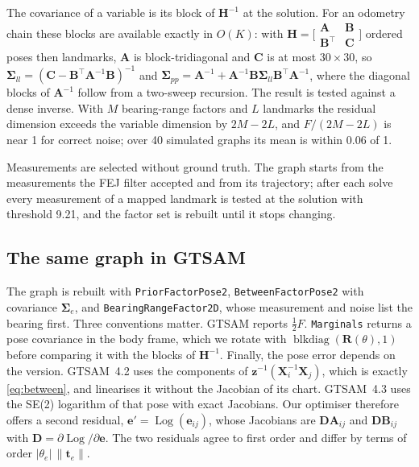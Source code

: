 \documentclass[conference]{IEEEtran}
\newcommand{\vect}[1]{\mathbf{#1}}
\newcommand{\T}{^{\top}}
\begin{document}
The covariance of a variable is its block of $\vect{H}^{-1}$ at the solution. For an odometry chain these blocks are available exactly in $O(K)$: with $\vect{H} = \bigl[\begin{smallmatrix}\vect{A} & \vect{B}\\ \vect{B}\T & \vect{C}\end{smallmatrix}\bigr]$ ordered poses then landmarks, $\vect{A}$ is block-tridiagonal and $\vect{C}$ is at most $30\times30$, so $\boldsymbol{\Sigma}_{ll} = (\vect{C} - \vect{B}\T\vect{A}^{-1}\vect{B})^{-1}$ and $\boldsymbol{\Sigma}_{pp} = \vect{A}^{-1} + \vect{A}^{-1}\vect{B}\boldsymbol{\Sigma}_{ll}\vect{B}\T\vect{A}^{-1}$, where the diagonal blocks of $\vect{A}^{-1}$ follow from a two-sweep recursion. The result is tested against a dense inverse. With $M$ bearing-range factors and $L$ landmarks the residual dimension exceeds the variable dimension by $2M - 2L$, and $F/(2M-2L)$ is near 1 for correct noise; over 40 simulated graphs its mean is within 0.06 of 1.

Measurements are selected without ground truth. The graph starts from the measurements the FEJ filter accepted and from its trajectory; after each solve every measurement of a mapped landmark is tested at the solution with threshold 9.21, and the factor set is rebuilt until it stops changing.

\subsection{The same graph in GTSAM}
The graph is rebuilt with \texttt{PriorFactorPose2}, \texttt{BetweenFactorPose2} with covariance $\boldsymbol{\Sigma}_e$, and \texttt{BearingRangeFactor2D}, whose measurement and noise list the bearing first. Three conventions matter. GTSAM reports $\tfrac12 F$. \texttt{Marginals} returns a pose covariance in the body frame, which we rotate with $\operatorname{blkdiag}(\vect{R}(\theta), 1)$ before comparing it with the blocks of $\vect{H}^{-1}$. Finally, the pose error depends on the version. GTSAM~4.2 uses the components of $\vect{z}^{-1}(\vect{X}_i^{-1}\vect{X}_j)$, which is exactly \eqref{eq:between}, and linearises it without the Jacobian of its chart. GTSAM~4.3 uses the SE(2) logarithm of that pose with exact Jacobians. Our optimiser therefore offers a second residual, $\vect{e}' = \operatorname{Log}(\vect{e}_{ij})$, whose Jacobians are $\vect{D}\vect{A}_{ij}$ and $\vect{D}\vect{B}_{ij}$ with $\vect{D} = \partial\operatorname{Log}/\partial\vect{e}$. The two residuals agree to first order and differ by terms of order $|\theta_e|\,\|\vect{t}_e\|$.
\end{document}
